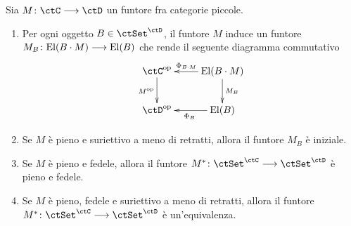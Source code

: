 \begin{exercise}\label{esercizio_equiv_sutr}
 Sia \(M \colon \ctC \fun \ctD\) un funtore fra categorie piccole.
 \begin{enumerate}
  \item Per ogni oggetto \(B \in \ctSet^{\ctD}\), il funtore \(M\) induce un funtore \(M_B \colon \mathrm{El}(B \cdot M) \longrightarrow \mathrm{El}(B)\)
        che rende il seguente diagramma commutativo
        \[ \xymatrix{ \ctC^{\op} \ar[d]_{M^{\op}} & \mathrm{El}(B \cmp M) \ar[l]_-{\Phi_{B \cmp M}} \ar[d]^{M_B} \\
         \ctD^{\op} & \mathrm{El}(B) \ar[l]^{\Phi_B} }\]
  \item Se \(M\) è pieno e suriettivo a meno di retratti, allora il funtore \(M_B\) è iniziale.
  \item Se \(M\) è pieno e fedele, allora il funtore \(M^* \colon \ctSet^\ctC \fun \ctSet^\ctD\)  è pieno e fedele.
  \item Se \(M\) è pieno, fedele e suriettivo a meno di retratti, allora il funtore \(M^* \colon \ctSet^\ctC \fun \ctSet^\ctD\)
        è un'equivalenza.
 \end{enumerate}
\end{exercise}

